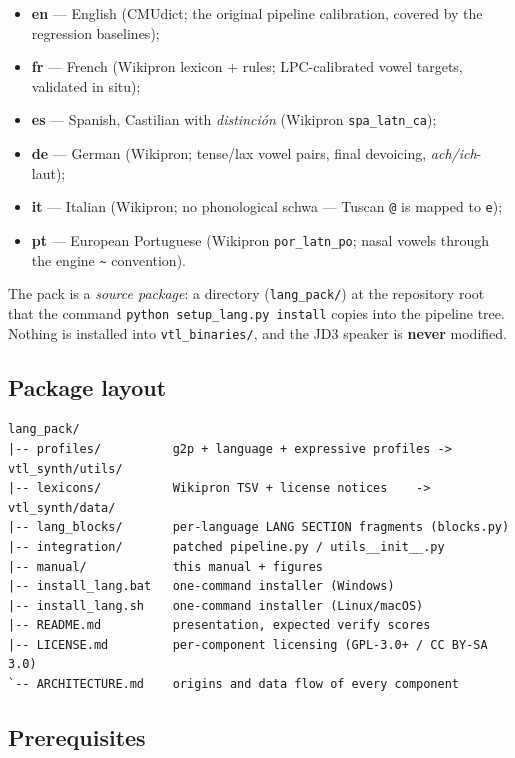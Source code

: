 \documentclass[11pt,a4paper]{article}
\newcommand{\code}[1]{\texttt{#1}}
\newcommand{\sampkey}[1]{\texttt{#1}}
\begin{document}
\begin{itemize}
\item \textbf{en} --- English (CMUdict; the original pipeline
      calibration, covered by the regression baselines);
\item \textbf{fr} --- French (Wikipron lexicon + rules; LPC-calibrated
      vowel targets, validated in situ);
\item \textbf{es} --- Spanish, Castilian with \emph{distinci\'on}
      (Wikipron \code{spa\_latn\_ca});
\item \textbf{de} --- German (Wikipron; tense/lax vowel pairs,
      final devoicing, \emph{ach/ich}-laut);
\item \textbf{it} --- Italian (Wikipron; no phonological schwa ---
      Tuscan \code{@} is mapped to \sampkey{e});
\item \textbf{pt} --- European Portuguese (Wikipron
      \code{por\_latn\_po}; nasal vowels through the engine
      \sampkey{\textasciitilde} convention).
\end{itemize}

The pack is a \emph{source package}: a directory
(\code{lang\_pack/}) at the repository root that the command
\code{python setup\_lang.py install} copies into the pipeline tree.
Nothing is installed into \code{vtl\_binaries/}, and the JD3 speaker
is \textbf{never} modified.

\subsection{Package layout}

{\small
\begin{verbatim}
lang_pack/
|-- profiles/          g2p + language + expressive profiles -> vtl_synth/utils/
|-- lexicons/          Wikipron TSV + license notices    -> vtl_synth/data/
|-- lang_blocks/       per-language LANG SECTION fragments (blocks.py)
|-- integration/       patched pipeline.py / utils__init__.py
|-- manual/            this manual + figures
|-- install_lang.bat   one-command installer (Windows)
|-- install_lang.sh    one-command installer (Linux/macOS)
|-- README.md          presentation, expected verify scores
|-- LICENSE.md         per-component licensing (GPL-3.0+ / CC BY-SA 3.0)
`-- ARCHITECTURE.md    origins and data flow of every component
\end{verbatim}
}

\subsection{Prerequisites}
\end{document}
